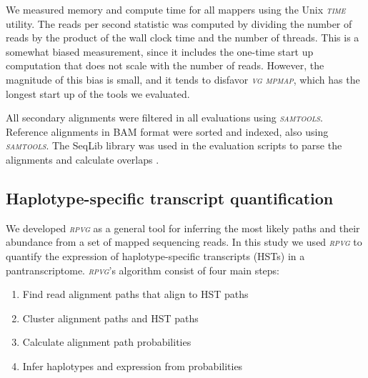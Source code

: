 \documentclass[11pt]{ucthesis}
\newcommand{\tool}[1]{\emph{\textsc{#1}}}
\begin{document}
\newline 
\newline
We measured memory and compute time for all mappers using the Unix \tool{time} utility. The reads per second statistic was computed by dividing the number of reads by the product of the wall clock time and the number of threads. This is a somewhat biased measurement, since it includes the one-time start up computation that does not scale with the number of reads. However, the magnitude of this bias is small, and it tends to disfavor \tool{vg mpmap}, which has the longest start up of the tools we evaluated.

All secondary alignments were filtered in all evaluations using \tool{samtools}. Reference alignments in BAM format were sorted and indexed, also using \tool{samtools}. The SeqLib library was used in the evaluation scripts to parse the alignments and calculate overlaps \cite{wala2016seqlib}.

\subsection{Haplotype-specific transcript quantification}

We developed \tool{rpvg} as a general tool for inferring the most likely paths and their abundance from a set of mapped sequencing reads. In this study we used \tool{rpvg} to quantify the expression of haplotype-specific transcripts (HSTs) in a pantranscriptome. \tool{rpvg}'s algorithm consist of four main steps:

\begin{enumerate}
    \item Find read alignment paths that align to HST paths
    \item Cluster alignment paths and HST paths
    \item Calculate alignment path probabilities 
    \item Infer haplotypes and expression from probabilities
\end{enumerate}
\end{document}
